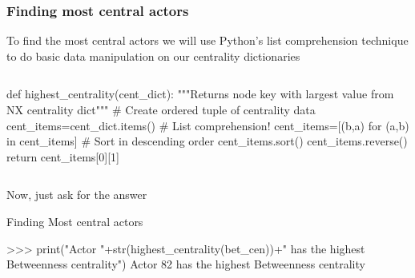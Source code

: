 \documentclass[xcolor=dvipsnames, 9pt]{beamer}
\begin{document}
\begin{frame}[fragile]
    \frametitle{Finding most central actors}
    To find the most central actors we will use Python's list comprehension technique to do basic data manipulation on our centrality dictionaries
    \begin{columns}
            \begin{block}{}
        \begin{code}
def highest_centrality(cent_dict):
    """Returns node key with largest value from
    NX centrality dict"""
    \alert<2>{# Create ordered tuple of centrality data
    cent_items=cent_dict.items()}
    \alert<3>{# List comprehension!
    cent_items=[(b,a) for (a,b) in cent_items]}
    \alert<4>{# Sort in descending order
    cent_items.sort()
    cent_items.reverse()
    return cent_items[0][1]}
        \end{code}
            \end{block}
    \end{columns}
    \vspace{2mm}Now, just ask for the answer
    \begin{block}{Finding Most central actors}
        \begin{code}
\scriptsize{>>>  print("Actor "+str(highest_centrality(bet_cen))+" has the highest Betweenness centrality")
\alert<5->{Actor 82 has the highest Betweenness centrality}}
        \end{code}
    \end{block}
\end{frame}
\end{document}
